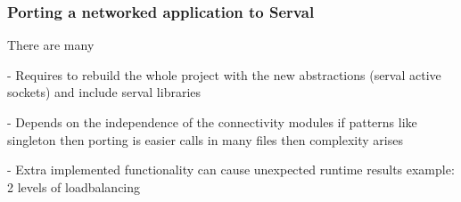 \subsubsection{Porting a networked application to Serval}
There are many 

- Requires to rebuild the whole project with the new abstractions (serval active sockets) and include serval libraries

- Depends on the independence of the connectivity modules
if patterns like singleton then porting is easier
calls in many files then complexity arises

- Extra implemented functionality can cause unexpected runtime results
example: 2 levels of loadbalancing

